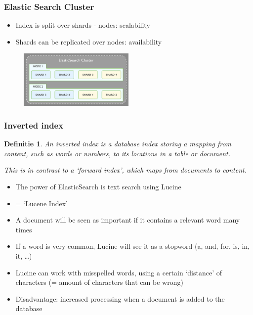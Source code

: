 \documentclass{article}
\newtheorem{theorem}{Definitie}[section]
\begin{document}
\subsubsection{Elastic Search Cluster}

\begin{itemize}
    \item Index is split over shards - nodes: scalability
    \item Shards can be replicated over nodes: availability
\end{itemize}

\begin{figure}[H]
    \centering
    \includegraphics[width=0.5\textwidth]{elasticsearch-searchcluster.png}
\end{figure}

\subsubsection{Inverted index}

\begin{theorem}
    An inverted index is a database index storing a mapping from content, such as words or numbers, to its locations in a table or document.

    This is in contrast to a `forward index', which maps from documents to content.
\end{theorem}

\begin{itemize}
    \item The power of ElasticSearch is text search using Lucine
    \item = `Lucene Index'
    \item A document will be seen as important if it contains a relevant word many times
    \item If a word is very common, Lucine will see it as a stopword (a, and, for, is, in, it, \dots)
    \item Lucine can work with misspelled words, using a certain `distance' of characters (= amount of characters that can be wrong)
    \item Disadvantage: increased processing when a document is added to the database
\end{itemize}
\end{document}

